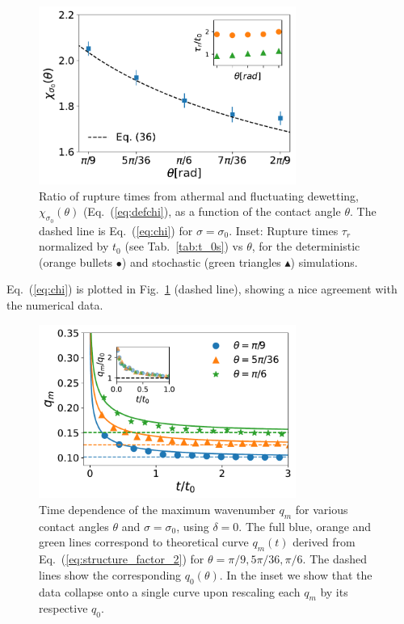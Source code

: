 \begin{figure}
    \centering
    \includegraphics[width=0.75\textwidth]{graphics/Andrea_model_t0_normed_rupture_times.pdf}
    \caption{Ratio of rupture times from athermal and fluctuating 
    dewetting, $\chi_{\sigma_0}(\theta)$ (Eq.~(\ref{eq:defchi}), as a function of the contact angle 
    $\theta$. The dashed line is Eq.~(\ref{eq:chi}) for $\sigma=\sigma_0$.
    Inset: Rupture times $\tau_r$ normalized by $t_0$ (see Tab.~\ref{tab:t_0s}) vs $\theta$, 
    for the deterministic (orange bullets \textcolor{pyorange}{$\bullet$}) and stochastic 
    (green triangles  \textcolor{pygreen}{$\blacktriangle$}) simulations.
    }
    \label{fig:rupture_times_semilogy_more_theta}
\end{figure}
Eq.~(\ref{eq:chi}) is plotted in Fig.~\ref{fig:rupture_times_semilogy_more_theta} (dashed line), showing a nice agreement with the numerical data.
\begin{figure}
    \centering
    \includegraphics[width=0.75\textwidth]{graphics/evolution_qm_with_inset_slip0.pdf}
    \caption{Time dependence of the maximum wavenumber $q_m$ for various contact angles $\theta$ and $\sigma = \sigma_0$, using $\delta=0$.
    The full blue, orange and green lines correspond to theoretical curve $q_m(t)$ derived from Eq.~(\ref{eq:structure_factor_2}) for $\theta = \pi/9, 5\pi/36, \pi/6$.
    The dashed lines show the corresponding $q_0(\theta)$. 
    In the inset we show that the data collapse onto a single curve upon rescaling each $q_m$ by its respective $q_0$.}
    \label{fig:evolution_spectrum_peak_with_t}
\end{figure}
